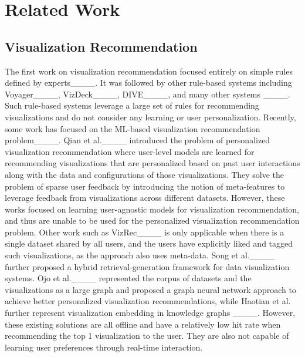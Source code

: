 \section{Related Work}
\subsection{Visualization Recommendation}
The first work on visualization recommendation focused entirely on simple rules defined by experts____.
It was followed by other rule-based systems including Voyager____, VizDeck____, DIVE____, and many other systems ____.
Such rule-based systems leverage a large set of rules for recommending visualizations and do not consider any learning or user personalization.
Recently, some work has focused on the ML-based visualization recommendation problem____. Qian et al.____ introduced the problem of personalized visualization recommendation where user-level models are learned for recommending visualizations that are personalized based on past user interactions along with the data and configurations of those visualizations. They solve the problem of sparse user feedback by introducing the notion of meta-features to leverage feedback from visualizations across different datasets. However, these works focused on learning user-agnostic models for visualization recommendation, and thus are unable to be used for the personalized visualization recommendation problem. Other work such as VizRec____ is only applicable when there is a single dataset shared by all users, and the users have explicitly liked and tagged such visualizations, as the approach also uses meta-data.
Song et al.____ further proposed a hybrid retrieval-generation framework for data visualization systems. 
Ojo et al.____ represented the corpus of datasets and the visualizations as a large graph and proposed a graph neural network approach to achieve better personalized visualization recommendations, while Haotian et al. further represent visualization embedding in knowledge graphs ____. However, these existing solutions are all offline and have a relatively low hit rate when recommending the top 1 visualization to the user. 
They are also not capable of learning user preferences through real-time interaction.

